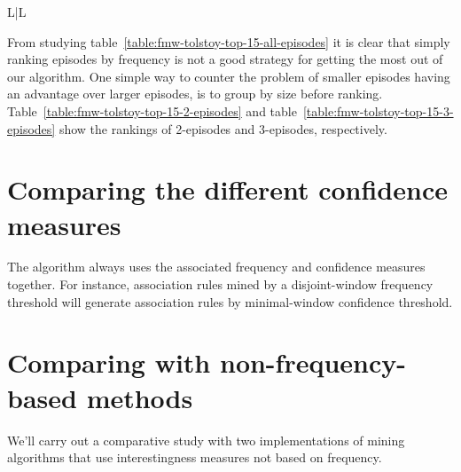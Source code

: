 \begin{table}
\begin{tabulary}{\textwidth}{L|L}
\end{tabulary}

\caption{The top 15 parallel 3-episodes found by our algorithm, with $ \rho = 15 $, and for the three frequency measures.}
\label{table:fmw-tolstoy-top-15-all-episodes}
\end{table}

From studying table~\ref{table:fmw-tolstoy-top-15-all-episodes} it is clear that simply ranking episodes by frequency is not a good strategy for getting the most out of our algorithm. One simple way to counter the problem of smaller episodes having an advantage over larger episodes, is to group by size before ranking. Table~\ref{table:fmw-tolstoy-top-15-2-episodes} and table~\ref{table:fmw-tolstoy-top-15-3-episodes} show the rankings of 2-episodes and 3-episodes, respectively.





\section{Comparing the different confidence measures}

The algorithm always uses the associated frequency and confidence measures together. For instance, association rules mined by a disjoint-window frequency threshold will generate association rules by  minimal-window confidence threshold.

\section{Comparing with non-frequency-based methods}

We'll carry out a comparative study with two implementations of mining algorithms that use interestingness measures not based on frequency.


